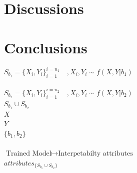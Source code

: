\documentclass[12pt]{report}
\begin{document}
\chapter{Discussions} 

\chapter{Conclusions} 

















\newpage


$S_{b_1} = \big\{X_i, Y_i\big\}_{i=1}^{i=n_1}\quad , X_i,Y_i \sim f(X,Y| b_1) $  \\ \\
$S_{b_2} = \big\{X_i, Y_i\big\}_{i=1}^{i=n_2}\quad , X_i,Y_i \sim f(X,Y| b_2) $ \\

$S_{b_1} \cup S_{b_2}$ \\

$X$ \\ $Y$ \\ $ \big\{b_1, b_2\big\}$ \\ \\ 

$\text{Trained Model} \mapsto \text{Interpetabilty attributes}$ \\
$attributes_{\{S_{b_1} \cup S_{b_2}\}}$

	
\newpage

\printbibliography
\end{document}
